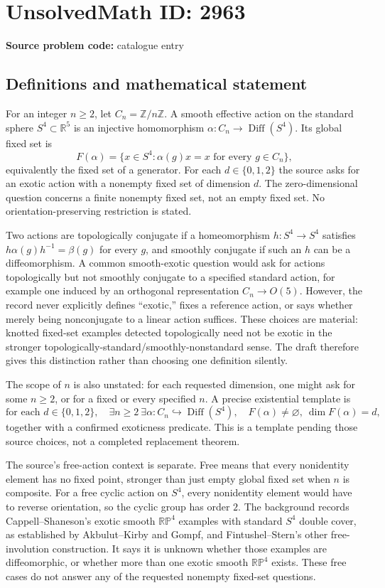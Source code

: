 \documentclass[11pt]{article}
\newcommand{\Z}{\mathbb{Z}}
\newcommand{\R}{\mathbb{R}}
\begin{document}
\section*{UnsolvedMath ID: 2963}
\textbf{Source problem code:} catalogue entry
\subsection{Definitions and mathematical statement}
For an integer $n\ge2$, let $C_n=\Z/n\Z$. A smooth effective action on the standard sphere $S^4\subset\R^5$ is an injective homomorphism $\alpha:C_n\to\operatorname{Diff}(S^4)$. Its global fixed set is
\[
 F(\alpha)=\{x\in S^4:\alpha(g)x=x\text{ for every }g\in C_n\},
\]
equivalently the fixed set of a generator. For each $d\in\{0,1,2\}$ the source asks for an exotic action with a nonempty fixed set of dimension $d$. The zero-dimensional question concerns a finite nonempty fixed set, not an empty fixed set. No orientation-preserving restriction is stated.

Two actions are topologically conjugate if a homeomorphism $h:S^4\to S^4$ satisfies $h\alpha(g)h^{-1}=\beta(g)$ for every $g$, and smoothly conjugate if such an $h$ can be a diffeomorphism. A common smooth-exotic question would ask for actions topologically but not smoothly conjugate to a specified standard action, for example one induced by an orthogonal representation $C_n\to O(5)$. However, the record never explicitly defines ``exotic,'' fixes a reference action, or says whether merely being nonconjugate to a linear action suffices. These choices are material: knotted fixed-set examples detected topologically need not be exotic in the stronger topologically-standard/smoothly-nonstandard sense. The draft therefore gives this distinction rather than choosing one definition silently.

The scope of $n$ is also unstated: for each requested dimension, one might ask for some $n\ge2$, or for a fixed or every specified $n$. A precise existential template is
\[
 \text{for each }d\in\{0,1,2\},\quad
 \exists n\ge2\ \exists\alpha:C_n\hookrightarrow\operatorname{Diff}(S^4),
 \quad F(\alpha)\ne\varnothing,\ \dim F(\alpha)=d,
\]
together with a confirmed exoticness predicate. This is a template pending those source choices, not a completed replacement theorem.

The source's free-action context is separate. Free means that every nonidentity element has no fixed point, stronger than just empty global fixed set when $n$ is composite. For a free cyclic action on $S^4$, every nonidentity element would have to reverse orientation, so the cyclic group has order $2$. The background records Cappell--Shaneson's exotic smooth $\mathbb{RP}^4$ examples with standard $S^4$ double cover, as established by Akbulut--Kirby and Gompf, and Fintushel--Stern's other free-involution construction. It says it is unknown whether those examples are diffeomorphic, or whether more than one exotic smooth $\mathbb{RP}^4$ exists. These free cases do not answer any of the requested nonempty fixed-set questions.
\end{document}
